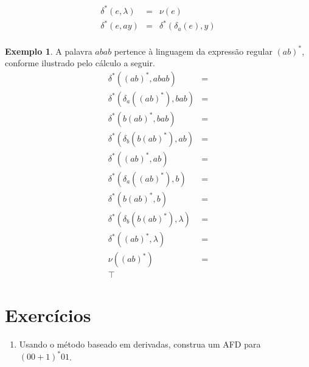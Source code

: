 \documentclass[a4paper]{article}
\theoremstyle{definition}
\newtheorem{Example}{Exemplo}
\begin{document}
  \[
    \begin{array}{lcl}
      \delta^*(e,\lambda) & = & \nu(e) \\
      \delta^*(e,ay)      & = & \delta^*(\delta_a(e), y) \\
    \end{array}
  \]

  \begin{Example}
    A palavra $abab$ pertence à linguagem da expressão regular $(ab)^*$,
    conforme ilustrado pelo cálculo a seguir.
    \[
      \begin{array}{lc}
        \delta^*((ab)^*,abab) & = \\
        \delta^*(\delta_a((ab)^*),bab) & = \\
        \delta^*(b(ab)^*,bab) & = \\
        \delta^*(\delta_b(b(ab)^*),ab) & = \\
        \delta^*((ab)^*,ab) & = \\
        \delta^*(\delta_a((ab)^*),b) & = \\
        \delta^*(b(ab)^*,b) & = \\
        \delta^*(\delta_b(b(ab)^*),\lambda) & = \\
        \delta^*((ab)^*,\lambda) & = \\
        \nu((ab)^*) & = \\
        \top
      \end{array}
    \]
  \end{Example}
  
  \section{Exercícios} 

  \begin{enumerate}
     \item Usando o método baseado em derivadas, construa um AFD para $(00 + 1)^*01$.
  \end{enumerate}
\end{document}

